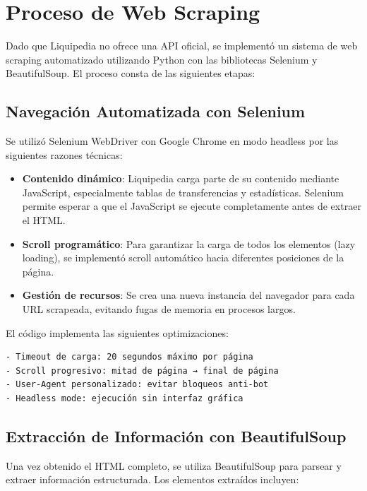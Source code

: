 \section{Proceso de Web Scraping}

Dado que Liquipedia no ofrece una API oficial, se implementó un sistema de web scraping automatizado utilizando Python con las bibliotecas Selenium y BeautifulSoup. El proceso consta de las siguientes etapas:

\subsection{Navegación Automatizada con Selenium}

Se utilizó Selenium WebDriver con Google Chrome en modo headless por las siguientes razones técnicas:

\begin{itemize}
    \item \textbf{Contenido dinámico}: Liquipedia carga parte de su contenido mediante JavaScript, especialmente tablas de transferencias y estadísticas. Selenium permite esperar a que el JavaScript se ejecute completamente antes de extraer el HTML.
    
    \item \textbf{Scroll programático}: Para garantizar la carga de todos los elementos (lazy loading), se implementó scroll automático hacia diferentes posiciones de la página.
    
    \item \textbf{Gestión de recursos}: Se crea una nueva instancia del navegador para cada URL scrapeada, evitando fugas de memoria en procesos largos.
\end{itemize}

El código implementa las siguientes optimizaciones:

\begin{verbatim}
- Timeout de carga: 20 segundos máximo por página
- Scroll progresivo: mitad de página → final de página
- User-Agent personalizado: evitar bloqueos anti-bot
- Headless mode: ejecución sin interfaz gráfica
\end{verbatim}

\subsection{Extracción de Información con BeautifulSoup}

Una vez obtenido el HTML completo, se utiliza BeautifulSoup para parsear y extraer información estructurada. Los elementos extraídos incluyen:

